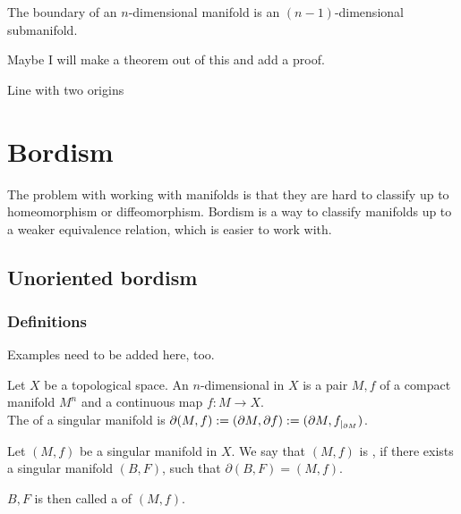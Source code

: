 \documentclass[a4paper,11pt]{article}
\begin{document}
\begin{remark}
    The boundary of an \(n\)-dimensional manifold is an \((n-1)\)-dimensional submanifold.
\end{remark}

Maybe I will make a theorem out of this and add a proof.

\begin{nonex}
    Line with two origins
\end{nonex}

\section{Bordism}

The problem with working with manifolds is that they are hard to classify up to homeomorphism or diffeomorphism. Bordism is a way to classify manifolds up to a weaker equivalence relation, which is easier to work with.

\subsection{Unoriented bordism}
\subsubsection{Definitions}
Examples need to be added here, too.

\begin{definition}\label{singular manifold}
    Let \(X\) be a topological space. An \(n\)-dimensional  in \(X\) is a pair \(M,f\) of a compact manifold \(M^n\) and a continuous map \(f:M\to X\).\\
    The  of a singular manifold is \(\partial(M,f):=(\partial M, \partial f):=(\partial M,f_{|_{\partial M}})\).
\end{definition}

\begin{definition}
    Let \((M,f)\) be a singular manifold in \(X\). We say that \((M,f)\) is , if there exists a singular manifold \((B,F)\), such that \(\partial(B,F)=(M,f)\).

    \(B,F\) is then called a  of \((M,f)\).
\end{definition}

\begin{example}
\end{example}
\end{document}
